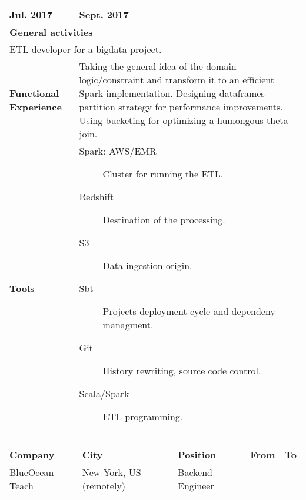 \begin{cventries}
\begin{tabular}{|p{4.5cm} | p{2cm} | p{4cm} | p{2cm} | p{2cm}|}
    Jul. 2017 & Sept. 2017 \\ 
    \hline
    \multicolumn{5}{|l|}{\textbf{General activities}} \\

     \multicolumn{5}{|p{15cm}|}{
       ETL developer for a bigdata project.
       } \\
     \hline
    \textbf{Functional Experience} & \multicolumn{4}{p{12cm}|}{

 Taking the general idea of the domain logic/constraint and transform it to an efficient Spark implementation. Designing dataframes partition strategy for performance improvements. Using bucketing for optimizing a humongous theta join.
      
      } \\
       \hline
      \textbf{Tools} & \multicolumn{4}{p{12cm}|}{
                       \begin{description}
                       \item[Spark: AWS/EMR] Cluster for running the ETL.
            
                       \item[Redshift] Destination of the processing.
                       
                       \item[S3] Data ingestion origin.

                       \item[Sbt] Projects deployment cycle and dependeny managment.
                       
                       \item[Git] History rewriting, source code control.

                       \item[Scala/Spark] ETL programming.

                       \end{description}
      } \\
 

    \hline

  \end{tabular}



 \begin{tabular}{|p{4.5cm} | p{2cm} | p{4cm} | p{2cm} | p{2cm}|}
    \hline
    \textbf{Company} & 
    \textbf{City} & 
    \textbf{Position} & 
    \textbf{From} & \textbf{To} \\
     \hline
    BlueOcean Teach & 
    New York, US \hspace{1cm} (remotely) & 
    Backend Engineer & 
    

\end{tabular}
\end{cventries}
